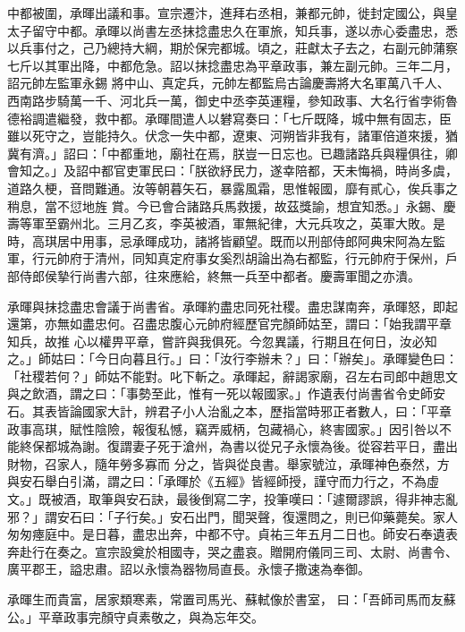 \begin{pinyinscope}
 中都被圍，承暉出議和事。宣宗遷汴，進拜右丞相，兼都元帥，徙封定國公，與皇太子留守中都。承暉以尚書左丞抹捻盡忠久在軍旅，知兵事，遂以赤心委盡忠，悉以兵事付之，己乃總持大綱，期於保完都城。頃之，莊獻太子去之，右副元帥蒲察七斤以其軍出降，中都危急。詔以抹捻盡忠為平章政事，兼左副元帥。三年二月，詔元帥左監軍永錫
 將中山、真定兵，元帥左都監烏古論慶壽將大名軍萬八千人、西南路步騎萬一千、河北兵一萬，御史中丞李英運糧，參知政事、大名行省孛術魯德裕調遣繼發，救中都。承暉間遣人以礬寫奏曰：「七斤既降，城中無有固志，臣雖以死守之，豈能持久。伏念一失中都，遼東、河朔皆非我有，諸軍倍道來援，猶冀有濟。」詔曰：「中都重地，廟社在焉，朕豈一日忘也。已趣諸路兵與糧俱往，卿會知之。」及詔中都官吏軍民曰：「朕欲紓民力，遂幸陪都，天未悔禍，時尚多虞，道路久梗，音問難通。汝等朝暮矢石，暴露風霜，思惟報國，靡有貳心，俟兵事之稍息，當不愆地旌
 賞。今已會合諸路兵馬救援，故茲獎諭，想宜知悉。」永錫、慶壽等軍至霸州北。三月乙亥，李英被酒，軍無紀律，大元兵攻之，英軍大敗。是時，高琪居中用事，忌承暉成功，諸將皆顧望。既而以刑部侍郎阿典宋阿為左監軍，行元帥府于清州，同知真定府事女奚烈胡論出為右都監，行元帥府于保州，戶部侍郎侯摯行尚書六部，往來應給，終無一兵至中都者。慶壽軍聞之亦潰。



 承暉與抹捻盡忠會議于尚書省。承暉約盡忠同死社稷。盡忠謀南奔，承暉怒，即起還第，亦無如盡忠何。召盡忠腹心元帥府經歷官完顏師姑至，謂曰：「始我謂平章知兵，故推
 心以權畀平章，嘗許與我俱死。今忽異議，行期且在何日，汝必知之。」師姑曰：「今日向暮且行。」曰：「汝行李辦未？」曰：「辦矣」。承暉變色曰：「社稷若何？」師姑不能對。叱下斬之。承暉起，辭謁家廟，召左右司郎中趙思文與之飲酒，謂之曰：「事勢至此，惟有一死以報國家。」作遺表付尚書省令史師安石。其表皆論國家大計，辨君子小人治亂之本，歷指當時邪正者數人，曰：「平章政事高琪，賦性陰險，報復私憾，竊弄威柄，包藏禍心，終害國家。」因引咎以不能終保都城為謝。復謂妻子死于滄州，為書以從兄子永懷為後。從容若平日，盡出財物，召家人，隨年勞多寡而
 分之，皆與從良書。舉家號泣，承暉神色泰然，方與安石舉白引滿，謂之曰：「承暉於《五經》皆經師授，謹守而力行之，不為虛文。」既被酒，取筆與安石訣，最後倒寫二字，投筆嘆曰：「遽爾謬誤，得非神志亂邪？」謂安石曰：「子行矣。」安石出門，聞哭聲，復還問之，則已仰藥薨矣。家人匆匆瘞庭中。是日暮，盡忠出奔，中都不守。貞祐三年五月二日也。師安石奉遺表奔赴行在奏之。宣宗設奠於相國寺，哭之盡哀。贈開府儀同三司、太尉、尚書令、廣平郡王，謚忠肅。詔以永懷為器物局直長。永懷子撒速為奉御。



 承暉生而貴富，居家類寒素，常置司馬光、蘇軾像於書室，
 曰：「吾師司馬而友蘇公。」平章政事完顏守貞素敬之，與為忘年交。




\end{pinyinscope}
